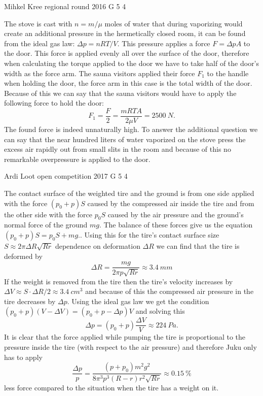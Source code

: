 \documentclass[11pt]{article}
\begin{document}
{Mihkel Kree} %
{regional round} %
{2016} %
{G 5} %
{4} %
{

\ifEngSolution
The stove is cast with $n=m/\mu$ moles of water that during vaporizing would create an additional pressure in the hermetically closed room, it can be found from the ideal gas law: $\Delta p = nRT/V$. This pressure applies a force $F=\Delta p A$ to the door. This force is applied evenly all over the surface of the door, therefore when calculating the torque applied to the door we have to take half of the door’s width as the force arm. The sauna visitors applied their force $F_1$ to the handle when holding the door, the force arm in this case is the total width of the door. Because of this we can say that the sauna visitors would have to apply the following force to hold the door:
\[F_1 = \frac{F}{2} = \frac{mRTA}{2 \mu V} = \SI{2500}{N}.\] 
The found force is indeed unnaturally high. To answer the additional question we can say that the near hundred liters of water vaporized on the stove press the excess air rapidly out from small slits in the room and because of this no remarkable overpressure is applied to the door.
\fi
}

{Ardi Loot} %
{open competition} %
{2017} %
{G 5} %
{4} %
{

\ifEngSolution
The contact surface of the weighted tire and the ground is from one side applied with the force $\left(p_{0}+p\right)S$ caused by the compressed air inside the tire and from the other side with the force $p_{0}S$ caused by the air pressure and the ground’s normal force of the ground $mg$. The balance of these forces give us the equation $\left(p_{0}+p\right)S=p_{0}S+mg.$. Using this for the tire’s contact surface size $S\approx2\pi\Delta R\sqrt{Rr}$ dependence on deformation $\Delta R$ we can find that the tire is deformed by 
\begin{equation}
\Delta R=\frac{mg}{2\pi p\sqrt{Rr}}\approx\SI{3.4}{mm}
\end{equation} 
If the weight is removed from the tire then the tire’s velocity increases by $\Delta V\approx S\cdot\Delta R/2\approx\SI{3.4}{cm^{3}}$ and because of this the compressed air pressure in the tire decreases by $\Delta p$. Using the ideal gas law we get the condition $\left(p_{0}+p\right)\left(V-\Delta V\right)=\left(p_{0}+p-\Delta p\right)V$ and solving this
\begin{equation}
\Delta p=\left(p_{0}+p\right)\frac{\Delta V}{V}\approx\SI{224}{Pa}.
\end{equation} 
It is clear that the force applied while pumping the tire is proportional to the pressure inside the tire (with respect to the air pressure) and therefore Juku only has to apply 
\[
\frac{\Delta p}{p}=\frac{\left(p+p_{0}\right)m^{2}g^{2}}{8\pi^{3}p^{3}\left(R-r\right)r^{2}\sqrt{Rr}}\approx\SI{0.15}{\percent}
\] 
less force compared to the situation when the tire has a weight on it.
\fi
}
\end{document}
